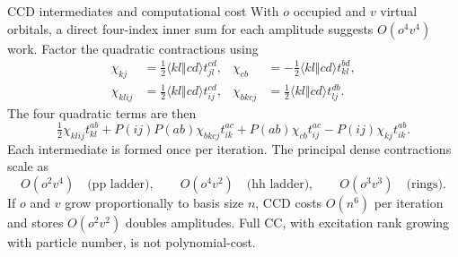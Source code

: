 \documentclass[aspectratio=169,10pt]{beamer}
\newcommand{\as}[4]{\langle #1#2\Vert #3#4\rangle}
\begin{document}
\begin{frame}{CCD intermediates and computational cost}
With $o$ occupied and $v$ virtual orbitals, a direct four-index inner sum for each amplitude suggests $O(o^4v^4)$ work. Factor the quadratic contractions using
\begin{align*}
 \chi_{kj}&=\tfrac12\as{k}{l}{c}{d}t_{jl}^{cd},&
 \chi_{cb}&=-\tfrac12\as{k}{l}{c}{d}t_{kl}^{bd},\\
 \chi_{klij}&=\tfrac12\as{k}{l}{c}{d}t_{ij}^{cd},&
 \chi_{bkcj}&=\tfrac12\as{k}{l}{c}{d}t_{lj}^{db}.
\end{align*}
The four quadratic terms are then
\[
 \tfrac12\chi_{klij}t_{kl}^{ab}
 +P(ij)P(ab)\chi_{bkcj}t_{ik}^{ac}
 +P(ab)\chi_{cb}t_{ij}^{ac}
 -P(ij)\chi_{kj}t_{ik}^{ab}.
\]
Each intermediate is formed once per iteration. The principal dense contractions scale as
\[
 O(o^2v^4)\quad\text{(pp ladder)},\qquad
 O(o^4v^2)\quad\text{(hh ladder)},\qquad O(o^3v^3)\quad\text{(rings)}.
\]
If $o$ and $v$ grow proportionally to basis size $n$, CCD costs $O(n^6)$ per iteration and stores $O(o^2v^2)$ doubles amplitudes. Full CC, with excitation rank growing with particle number, is not polynomial-cost.
\end{frame}
\end{document}
